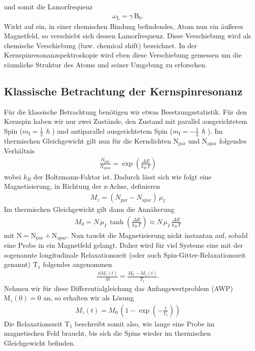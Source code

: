 \documentclass[10pt,twoside]{article}
\renewcommand{\d}{~\text{d}}
\renewcommand{\1}{^{-1}}
\renewcommand{\2}{^{-2}}
\newcommand{\3}{^{-3}}
\newcommand{\4}{^{-4}}
\newcommand{\5}{^{-5}}
\newcommand{\6}{^{-6}}
\newcommand{\7}{^{-7}}
\newcommand{\8}{^{-8}}
\newcommand{\9}{^{-9}}
\begin{document}
und somit die Lamorfrequenz
\begin{align*}
\omega_{\text{L}}= \gamma\,\text{B}_0{.}
\end{align*}
Wirkt auf ein, in einer chemischen Bindung befindendes, Atom nun ein äußeres Magnetfeld, 
so verschiebt sich dessen Lamorfrequenz. Diese Verschiebung wird als chemische Verschiebung (bzw. chemical shift) bezeichnet. 
In der Kernspinresonanzspektroskopie wird eben diese Verschiebung gemessen um die räumliche Struktur des Atoms und seiner Umgebung zu erforschen.

\subsection{Klassische Betrachtung der Kernspinresonanz}

Für die klassische Betrachtung benötigen wir etwas Besetzungsstatistik. 
Für den Kernspin haben wir nur zwei Zustände, den Zustand mit parallel ausgerichtetem Spin ($m_{\text{I}} =\frac{1}{2}\,\hslash$) 
und antiparallel ausgerichtetem Spin ($m_{\text{I}} =-\frac{1}{2}\,\hslash$). 
Im thermischen Gleichgewicht gilt nun für die Kerndichten $\text{N}_{\text{par}}$ und $\text{N}_{\text{apar}}$ folgendes Verhältnis
\begin{align*}
\frac{N_{\text{par}}}{N_{\text{apar}}} = \exp(\frac{\Delta E}{k_B\,T}) 
\end{align*}
wobei $k_B$ der Boltzmann-Faktor ist. Dadurch lässt sich wie folgt eine Magnetisierung, in Richtung der z-Achse, definieren 
\begin{align*}
M_z = (N_{\text{par}} - N_{\text{apar}})\,\mu_I
\end{align*}
Im thermischen Gleichgewicht gilt dann die Annäherung
\begin{align*}
M_0 = N\,\mu_I\,\tanh(\frac{\Delta E}{k_B\,T})\approx N\,\mu_I\,\frac{\Delta E}{k_B\,T}
\end{align*}
mit $\text{N}=\text{N}_{\text{par}} + \text{N}_{\text{apar}}$. Nun taucht die Magnetisierung nicht instantan auf, sobald eine Probe in ein Magnetfeld gelangt. 
Daher wird für viel Systeme eine mit der sogenannte longitudinale Relaxationszeit 
(oder auch Spin-Gitter-Relaxationszeit genannt) $\text{T}_1$ folgendes angenommen
\begin{align*}
\frac{\d M_z(t)}{\d t} =\frac{M_0 - M_z(t)}{T_1}{.}
\end{align*}
Nehmen wir für diese Differentialgleichung das Anfangswertproblem (AWP) $\text{M}_z(0)=0$ an, so erhalten wir als Lösung
\begin{align*}
M_z(t) = M_0\,(1-\exp(-\frac{t}{T_1}))
\end{align*}
Die Relaxationszeit $\text{T}_1$ beschreibt somit also, 
wie lange eine Probe im magnetischen Feld braucht, bis sich die Spins wieder im thermischen Gleichgewicht befinden.\par 
\end{document}
